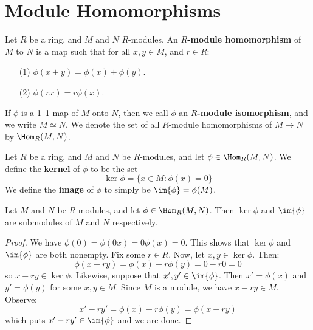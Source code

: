 \section{Module Homomorphisms}

\begin{definition}
  Let $R$ be a ring, and $M$ and  $N$  $R$-modules. An
  \textbf{$R$-module homomorphism} of $M$ to $N$ is a map such that
  for all $x,y \in M$, and $r \in R$:
  \begin{enumerate}
    \item[(1)] $\phi(x+y)=\phi(x)+\phi(y)$.

    \item[(2)] $\phi(rx)=r\phi(x)$.
  \end{enumerate}
  If $\phi$ is a 1--1 map of $M$ onto $N$, then we call  $\phi$ an
  \textbf{$R$-module isomorphism}, and we write $M \simeq N$. We
  denote the set of all $R$-module homomorphisms of  $M \xrightarrow{}
  N$ by $\Hom_R{(M,N)}$.
\end{definition}

\begin{definition}
  Let $R$ be a ring, and $M$ and $N$ be $R$-modules, and let $\phi \in
  \Hom_R{(M,N)}$. We define the \textbf{kernel} of $\phi$ to be the
  set
  \begin{equation*}
    \ker{\phi}=\{ x \in M : \phi(x)=0 \}
  \end{equation*}
  We define the \textbf{image} of $\phi$ to simply be
  $\im{\phi}=\phi(M)$.
\end{definition}

\begin{lemma}\label{label_4.2.1}
  Let $M$ and $N$ be $R$-modules, and let  $\phi \in \Hom_R{(M,N)}$.
  Then $\ker{\phi}$ and $\im{\phi}$ are submodules
  of $M$ and $N$ respectively.
\end{lemma}
\begin{proof}
  We have $\phi(0)=\phi(0x)=0\phi(x)=0$. This shows that $\ker{\phi}$
  and $\im{\phi}$ are both nonempty. Fix some $r \in R$. Now,
  let $x,y \in \ker{\phi}$. Then:
  \begin{equation*}
    \phi(x-ry)=\phi(x)-r\phi(y)=0-r0=0
  \end{equation*}
  so $x-ry \in \ker{\phi}$. Likewise, suppose that $x', y' \in
  \im{\phi}$. Then $x'=\phi(x)$ and $y'=\phi(y)$ for some $x,y \in M$.
  Since $M$ is a module, we have $x-ry \in M$. Observe:
  \begin{equation*}
    x'-ry'=\phi(x)-r\phi(y)=\phi(x-ry)
  \end{equation*}
  which puts $x'-ry' \in \im{\phi}$ and we are done.
\end{proof}

